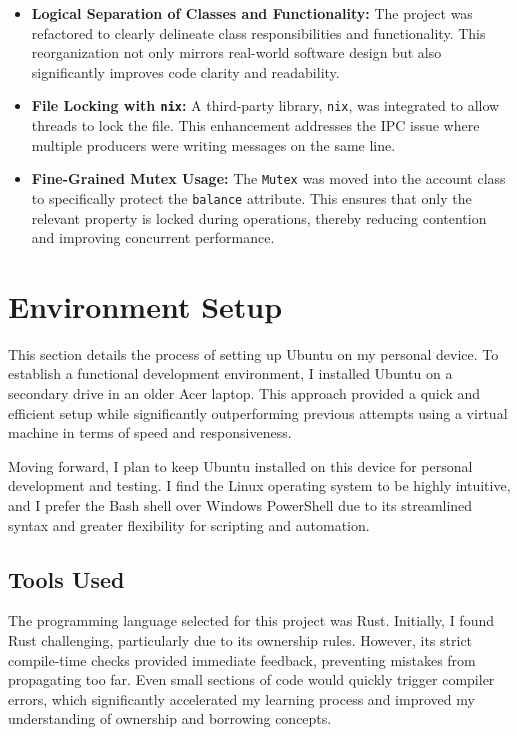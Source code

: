\documentclass[conference]{report}
\begin{document}
\begin{itemize}
    \item \textbf{Logical Separation of Classes and Functionality:} The project was refactored to clearly delineate class responsibilities and functionality. This reorganization not only mirrors real-world software design but also significantly improves code clarity and readability.
    \item \textbf{File Locking with \texttt{nix}:} A third-party library, \texttt{nix}, was integrated to allow threads to lock the file. This enhancement addresses the IPC issue where multiple producers were writing messages on the same line.
    \item \textbf{Fine-Grained Mutex Usage:} The \texttt{Mutex} was moved into the account class to specifically protect the \texttt{balance} attribute. This ensures that only the relevant property is locked during operations, thereby reducing contention and improving concurrent performance.
\end{itemize}

\chapter{Environment Setup}
This section details the process of setting up Ubuntu on my personal device. To establish a functional development environment, I installed Ubuntu on a secondary drive in an older Acer laptop. This approach provided a quick and efficient setup while significantly outperforming previous attempts using a virtual machine in terms of speed and responsiveness.  

Moving forward, I plan to keep Ubuntu installed on this device for personal development and testing. I find the Linux operating system to be highly intuitive, and I prefer the Bash shell over Windows PowerShell due to its streamlined syntax and greater flexibility for scripting and automation.

\section*{Tools Used}
The programming language selected for this project was Rust. Initially, I found Rust challenging, particularly due to its ownership rules. However, its strict compile-time checks provided immediate feedback, preventing mistakes from propagating too far. Even small sections of code would quickly trigger compiler errors, which significantly accelerated my learning process and improved my understanding of ownership and borrowing concepts.  
\end{document}
